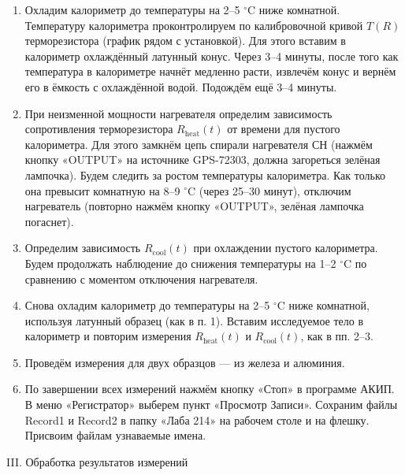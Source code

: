 \documentclass[a4paper,12pt]{article} %
\begin{document}
\begin{enumerate}
    \item Охладим калориметр до температуры на 2–5 $^\circ$C ниже комнатной. Температуру калориметра проконтролируем по калибровочной кривой $T(R)$ терморезистора (график рядом с установкой). Для этого вставим в калориметр охлаждённый латунный конус. Через 3–4 минуты, после того как температура в калориметре начнёт медленно расти, извлечём конус и вернём его в ёмкость с охлаждённой водой. Подождём ещё 3–4 минуты.

    \item При неизменной мощности нагревателя определим зависимость сопротивления терморезистора $R_{\text{heat}}(t)$ от времени для пустого калориметра. Для этого замкнём цепь спирали нагревателя СН (нажмём кнопку «OUTPUT» на источнике GPS-72303, должна загореться зелёная лампочка). Будем следить за ростом температуры калориметра. Как только она превысит комнатную на 8–9 $^\circ$C (через 25–30 минут), отключим нагреватель (повторно нажмём кнопку «OUTPUT», зелёная лампочка погаснет).

    \item Определим зависимость $R_{\text{cool}}(t)$ при охлаждении пустого калориметра. Будем продолжать наблюдение до снижения температуры на 1–2 $^\circ$C по сравнению с моментом отключения нагревателя. 

    \item Снова охладим калориметр до температуры на 2–5 $^\circ$C ниже комнатной, используя латунный образец (как в п. 1). Вставим исследуемое тело в калориметр и повторим измерения $R_{\text{heat}}(t)$ и $R_{\text{cool}}(t)$, как в пп. 2–3.

    \item Проведём измерения для двух образцов — из железа и алюминия.

    \item По завершении всех измерений нажмём кнопку «Стоп» в программе АКИП. В меню «Регистратор» выберем пункт «Просмотр Записи». Сохраним файлы Record1 и Record2 в папку «Лаба 214» на рабочем столе и на флешку. Присвоим файлам узнаваемые имена.
\end{enumerate}

\begin{center}
  \textsf{III. Обработка результатов измерений}
\end{center}
\end{document}
